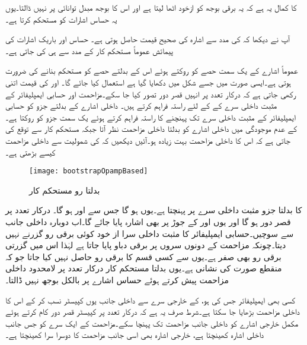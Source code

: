  کا کمال یہ ہے کہ یہ برقی بوجھ  کو ازخود اٹھا لیتا ہے اور اس کا بوجھ مبدل توانائی پر نہیں ڈالتا۔یوں یہ حساس اشارات کو مستحکم کرتا ہے۔

آپ نے دیکھا کہ  کی مدد سے اشارہ کی صحیح قیمت حاصل ہوتی ہے۔ حساس اور باریک اشارات کی پیمائش عموماً مستحکم کار کے مدد سے ہی کی جاتی ہے۔

عموماً اشارے کے یک سمت حصے کو روکتے ہوئے اس کے بدلتے حصے کو مستحکم بنانے کی ضرورت ہوتی ہے۔ایسی صورت میں  جسے شکل  میں دکھایا گیا ہے استعمال کیا جائے گا۔ اور  کی قیمت اتنی رکھی جاتی ہے کہ درکار تعدد پر انہیں قصر دور تصور کیا جا سکے۔مزاحمت  اور  حسابی ایمپلیفائر کے مثبت داخلی سرے  کے  کے لئے راستہ فراہم کرتے ہیں۔ داخلی اشارے کے بدلتے جزو کو حسابی ایمپلیفائر کے مثبت داخلی سرے  تک پہنچنے کا راستہ فراہم کرتے ہوئے یک سمت جزو کو روکتا ہے۔ کے عدم موجودگی میں داخلی اشارے کو بدلتا داخلی مزاحمت  نظر آتا جبکہ مستحکم کار سے توقع کی جاتی ہے کہ اس کا داخلی مزاحمت بہت زیادہ ہو۔آئیں دیکھیں کہ  کی شمولیت سے داخلی مزاحمت کیسے بڑھتی ہے۔
\begin{figure}
\centering
\texttt{[image: bootstrapOpampBased]}
\caption{بدلتا رو مستحکم کار}
\label{شکل_بدلتا_رو_وسطی_دور}
\end{figure}
 کا بدلتا جزو  مثبت داخلی سرے پر پہنچتا ہے۔یوں  ہو گا جس سے  اور  ہو گا۔ درکار  تعدد پر قصر دور ہو گا اور یوں  اور  کے جوڑ پر بھی  اشارہ پایا جائے گا۔اب دوبارہ داخلی جانب سے سوچیں۔حسابی ایمپلیفائر کا مثبت داخلی سرا  از خود کوئی برقی رو گزرنے نہیں دیتا۔چونکہ مزاحمت  کے دونوں سروں پر  برقی دباو پایا جاتا ہے لہٰذا اس میں گزرتی برقی رو بھی صفر ہے۔یوں  سے کسی قسم کا برقی رو حاصل نہیں کیا جاتا جو کہ منقطع صورت کی نشانی ہے۔یوں بدلتا مستحکم کار درکار تعدد پر لامحدود داخلی مزاحمت پیش کرتے ہوئے حساس اشارے پر بالکل بوجھ نہیں ڈالتا۔

کسی بھی ایمپلیفائر جس کی   ہو،  کے  خارجی سرے  سے داخلی جانب یوں کپیسٹر  نسب کر کے اس کا داخلی مزاحمت بڑھایا جا سکتا ہے۔شرط صرف یہ ہے کہ درکار تعدد پر کپیسٹر قصر دور کام کرتے ہوئے مکمل خارجی اشارے کو داخلی جانب مزاحمت  تک  پہنچا سکے۔مزاحمت  کے ایک سرے کو جس جانب  داخلی اشارہ کھینچتا ہے، خارجی اشارہ بھی اسی جانب مزاحمت کا دوسرا سرا کھینچتا ہے۔

